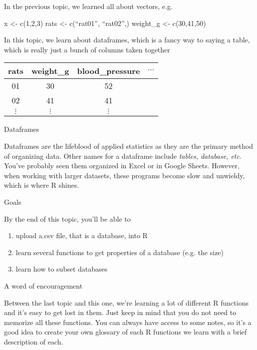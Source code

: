\documentclass[11pt]{amsart}
\renewcommand{\(}{\left(}
\renewcommand{\)}{\right)}
\newenvironment{notes}{%
	\begin{description}[style=nextline]%
		\setlength{\itemsep}{10pt}%
		\setlength{\parskip}{2pt}%
	}
        {
	\end{description}
}
\begin{document}
\begin{notes}

\item 	In the previous topic, we learned all about vectors, e.g.
	
	\begin{rcode}
		x <- c(1,2,3)
		rats <- c(``rat01'', ``rat02'',)
		weight_g <- c(30,41,50)
	\end{rcode}

	In this topic, we learn about dataframes, which is a fancy way to saying a table, which is really just a bunch of columns taken together	
	
	\begin{center}
          \begin{tabular}{cccc}
            rats & weight\_g & blood\_pressure & $\cdots$ \\
            \hline\hline
            01&30&52&\\
            02&41&41&\\
            $\vdots$&$\vdots$&$\vdots$&\\
          \end{tabular}
	\end{center}
        
 \item[Dataframes]

	Dataframes are the lifeblood of applied statistics as they are the primary method of organizing data.  Other names for a dataframe include \textit{tables, database, etc}.  You've probably seen them organized in Excel or in Google Sheets. However, when working with larger datasets, these programs become slow and unwieldy, which is where R shines.  	
	
\item[Goals]

  By the end of this topic, you'll be able to
  \begin{enumerate}
  \item upload a.csv file, that is a database, into R
  \item learn several functions to get properties of a database (e.g. the size)
  \item learn how to subset databases
  \end{enumerate}
  
\item[A word of encouragement]

  Between the last topic and this one, we're learning a lot of
  different R functions and it's easy to get lost in them.  Just keep
  in mind that you do not need to memorize all these functions.  You
  can always have access to some notes, so it's a good idea to create
  your own glossary of each R functions we learn with a brief
  description of each.
  
\end{notes}
\end{document}
